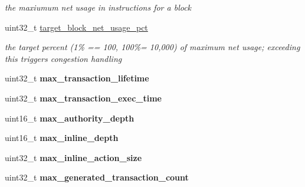 \begin{DoxyCompactItemize}
\begin{DoxyCompactList}\small\item\em the maxiumum net usage in instructions for a block \end{DoxyCompactList}\item 
\mbox{\label{structaacio_1_1chain_1_1chain__config_a5cafbf95b3fdff06ce830499bdc2c31d}} 
uint32\+\_\+t \mbox{\hyperlink{structaacio_1_1chain_1_1chain__config_a5cafbf95b3fdff06ce830499bdc2c31d}{target\+\_\+block\+\_\+net\+\_\+usage\+\_\+pct}}
\begin{DoxyCompactList}\small\item\em the target percent (1\% == 100, 100\%= 10,000) of maximum net usage; exceeding this triggers congestion handling \end{DoxyCompactList}\item 
\mbox{\label{structaacio_1_1chain_1_1chain__config_a4e4aae86d888f33e519f6b1db1214b25}} 
uint32\+\_\+t {\bfseries max\+\_\+transaction\+\_\+lifetime}
\item 
\mbox{\label{structaacio_1_1chain_1_1chain__config_a304e4d7c37b2a517bc823c2f7e0c5133}} 
uint32\+\_\+t {\bfseries max\+\_\+transaction\+\_\+exec\+\_\+time}
\item 
\mbox{\label{structaacio_1_1chain_1_1chain__config_a0bc6bad9832867069ed4feeee068f141}} 
uint16\+\_\+t {\bfseries max\+\_\+authority\+\_\+depth}
\item 
\mbox{\label{structaacio_1_1chain_1_1chain__config_a32c5c5135eceaf9720c0dab6e340d936}} 
uint16\+\_\+t {\bfseries max\+\_\+inline\+\_\+depth}
\item 
\mbox{\label{structaacio_1_1chain_1_1chain__config_a57efc32821c55830136d72d0df33d588}} 
uint32\+\_\+t {\bfseries max\+\_\+inline\+\_\+action\+\_\+size}
\item 
\mbox{\label{structaacio_1_1chain_1_1chain__config_a164878e4c546f8eb4b55d0fa36cb5a66}} 
uint32\+\_\+t {\bfseries max\+\_\+generated\+\_\+transaction\+\_\+count}
\end{DoxyCompactItemize}

